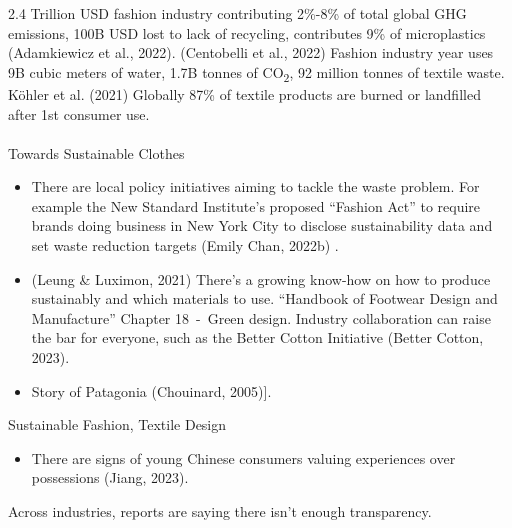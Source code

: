 \documentclass[
  letterpaper,
  DIV=11,
  numbers=noendperiod]{scrartcl}
\makeatletter
\let\oldparagraph\paragraph
\renewcommand{\paragraph}{
    \@ifstar
      \xxxParagraphStar
      \xxxParagraphNoStar
  }
\newcommand{\xxxParagraphStar}[1]{\oldparagraph*{#1}\mbox{}}
\newcommand{\xxxParagraphNoStar}[1]{\oldparagraph{#1}\mbox{}}
\providecommand{\tightlist}{%
  \setlength{\itemsep}{0pt}\setlength{\parskip}{0pt}}\usepackage{longtable,booktabs,array}
\makeatother
\begin{document}
2.4 Trillion USD fashion industry contributing 2\%-8\% of total global
GHG emissions, 100B USD lost to lack of recycling, contributes 9\% of
microplastics (Adamkiewicz et al., 2022). (Centobelli et al., 2022)
Fashion industry year uses 9B cubic meters of water, 1.7B tonnes of
CO\textsubscript{2}, 92 million tonnes of textile waste. Köhler et al.
(2021) Globally 87\% of textile products are burned or landfilled after
1st consumer use.

\paragraph{Towards Sustainable
Clothes}\label{towards-sustainable-clothes}

\begin{itemize}
\item
  There are local policy initiatives aiming to tackle the waste problem.
  For example the New Standard Institute's proposed ``Fashion Act'' to
  require brands doing business in New York City to disclose
  sustainability data and set waste reduction targets (Emily Chan,
  2022b) .
\item
  (Leung \& Luximon, 2021) There's a growing know-how on how to produce
  sustainably and which materials to use. ``Handbook of Footwear Design
  and Manufacture'' Chapter 18~-~Green design. Industry collaboration
  can raise the bar for everyone, such as the Better Cotton Initiative
  (Better Cotton, 2023).
\item
  Story of Patagonia (Chouinard, 2005){]}.
\end{itemize}

Sustainable Fashion, Textile Design

\begin{itemize}
\tightlist
\item
  There are signs of young Chinese consumers valuing experiences over
  possessions (Jiang, 2023).
\end{itemize}

Across industries, reports are saying there isn't enough transparency.
\end{document}
